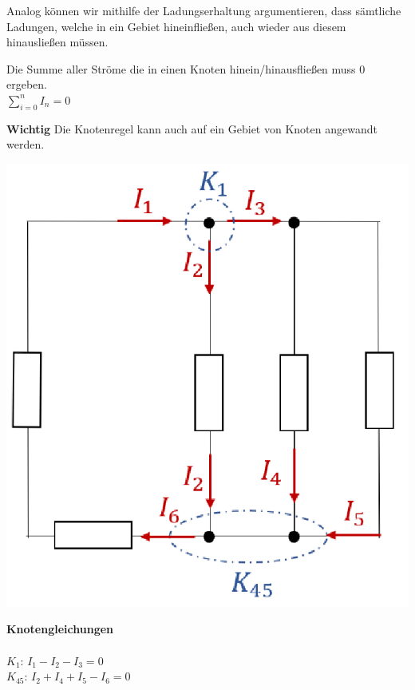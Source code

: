 					Analog können wir mithilfe der Ladungserhaltung argumentieren, dass sämtliche Ladungen, welche in ein Gebiet hineinfließen, auch wieder aus diesem hinausließen müssen.

					\beginip
					Die Summe aller Ströme die in einen Knoten hinein/hinausfließen muss $0$ ergeben. \\
					\formulaBegin
					$\displaystyle\sum_{i=0}^n I_n = 0 $
					\formulaEnd
          \iend

					\textbf{Wichtig} Die Knotenregel kann auch auf ein Gebiet von Knoten angewandt werden. \\


					\begin{minipage}{0.6\textwidth}
					\begin{flushright}
							\includegraphics[scale=0.4]{img/knotengl.png}
						\end{flushright}
					\end{minipage}
					\begin{minipage}{0.4\textwidth}

						\textbf{Knotengleichungen} \\ \\
						$\displaystyle K_1$: $ I_1 - I_2 - I_3 = 0 $ \\
						$\displaystyle K_{45}$: $ I_2 + I_4 + I_5 - I_6 = 0 $ \\
					\end{minipage}


